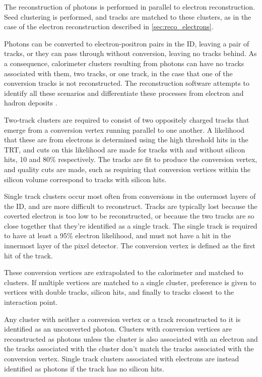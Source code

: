 The reconstruction of photons is performed in parallel to electron reconstruction. Seed clustering is performed, and tracks are matched to these clusters, as in the case of the electron reconstruction described in \autoref{sec:reco_electrons}. 

Photons can be converted to electron-positron pairs in the \ac{ID}, leaving a pair of tracks, or they can pass through without conversion, leaving no tracks behind. As a consequence, calorimeter clusters resulting from photons can have no tracks associated with them, two tracks, or one track, in the case that one of the conversion tracks is not reconstructed. The reconstruction software attempts to identify all these scenarios and differentiate these processes from electron and hadron deposits \cite{1606.01813}.

Two-track clusters are required to consist of two oppositely charged tracks that emerge from a conversion vertex running parallel to one another. A likelihood that these are from electrons is determined using the high threshold hits in the \ac{TRT}, and cuts on this likelihood are made for tracks with and without silicon hits, 10 and 80\% respectively. The tracks are fit to produce the conversion vertex, and quality cuts are made, such as requiring that conversion vertices within the silicon volume correspond to tracks with silicon hits. 

Single track clusters occur most often from conversions in the outermost layers of the \ac{ID}, and are more difficult to reconstruct. Tracks are typically lost because the coverted electron is too low \pt to be reconstructed, or because the two tracks are so close together that they're identified as a single track. The single track is required to have at least a 95\% electron likelihood, and must not have a hit in the innermost layer of the pixel detector. The conversion vertex is defined as the first hit of the track. 

These conversion vertices are extrapolated to the calorimeter and matched to clusters. If multiple vertices are matched to a single cluster, preference is given to vertices with double tracks, silicon hits, and finally to tracks closest to the interaction point. 

Any cluster with neither a conversion vertex or a track reconstructed to it is identified as an unconverted photon. Clusters with conversion vertices are reconstructed as photons unless the cluster is also associated with an electron and the tracks associated with the cluster don't match the tracks associated with the conversion vertex. Single track clusters associated with electrons are instead identified as photons if the track has no silicon hits. 

